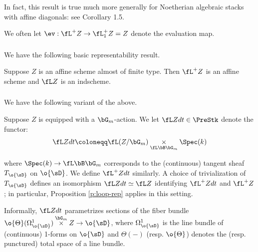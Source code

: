\begin{rem}
\notready

In fact, this result is true much more
generally for Noetherian algebraic
stacks with affine diagonals: see \cite{bhatt-hl} Corollary 1.5.

\end{rem}

\begin{notation}
\notready

We often let $\ev:\fL^+ Z \to \fL_1^+ Z = Z$
denote the evaluation map.

\end{notation}

\subsubsection{}

We have the following basic representability result.

\begin{prop}
\notready\label{p:loop-rep}

Suppose $Z$ is an affine scheme almost of finite type.
Then $\fL^+ Z$ is an affine scheme and $\fL Z$ is an
indscheme.

\end{prop}

\subsubsection{}

We have the following variant of the above.

Suppose $Z$ is equipped with a $\bG_m$-action.
We let $\fL Zdt \in \PreStk$ denote the functor:
%
\[
\fL Z dt \coloneqq \fL(Z/\bG_m) \underset{\fL \bB \bG_m}{\times} \Spec(k)
\]

 where $\Spec(k) \to \fL \bB \bG_m$ corresponds to the
(continuous) tangent sheaf $T_{\o{\sD}}$ on $\o{\sD}$.
We define $\fL^+Z dt$ similarly. A choice of trivialization
of $T_{\o{\sD}}$ defines an isomorphism $\fL Z dt \simeq \fL Z$
identifying $\fL^+ Z dt$ and $\fL^+ Z$; in particular,
Proposition \ref{p:loop-rep} applies in this setting.

Informally, $\fL Z dt$ parametrizes sections of
the fiber bundle $\o{\Theta}(\Omega_{\o{\sD}}^1) \overset{\bG_m}{\times} Z \to
\o{\sD}$, where $\Omega_{\o{\sD}}^1$ is the line bundle
of (continuous) 1-forms on $\o{\sD}$ and $\Theta(-)$
(resp. $\o{\Theta}$) denotes the
(resp. punctured) total space of a line bundle.


